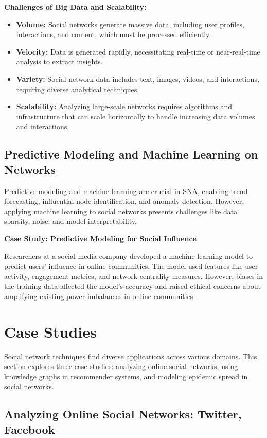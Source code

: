 \documentclass[12pt]{book} %
\begin{document}
\textbf{Challenges of Big Data and Scalability:}
\begin{itemize}
    \item \textbf{Volume:} Social networks generate massive data, including user profiles, interactions, and content, which must be processed efficiently.
    \item \textbf{Velocity:} Data is generated rapidly, necessitating real-time or near-real-time analysis to extract insights.
    \item \textbf{Variety:} Social network data includes text, images, videos, and interactions, requiring diverse analytical techniques.
    \item \textbf{Scalability:} Analyzing large-scale networks requires algorithms and infrastructure that can scale horizontally to handle increasing data volumes and interactions.
\end{itemize}

\subsection{Predictive Modeling and Machine Learning on Networks}

Predictive modeling and machine learning are crucial in SNA, enabling trend forecasting, influential node identification, and anomaly detection. However, applying machine learning to social networks presents challenges like data sparsity, noise, and model interpretability.

\textbf{Case Study: Predictive Modeling for Social Influence}

Researchers at a social media company developed a machine learning model to predict users' influence in online communities. The model used features like user activity, engagement metrics, and network centrality measures. However, biases in the training data affected the model's accuracy and raised ethical concerns about amplifying existing power imbalances in online communities.


\section{Case Studies}

Social network techniques find diverse applications across various domains. This section explores three case studies: analyzing online social networks, using knowledge graphs in recommender systems, and modeling epidemic spread in social networks.

\subsection{Analyzing Online Social Networks: Twitter, Facebook}
\end{document}
